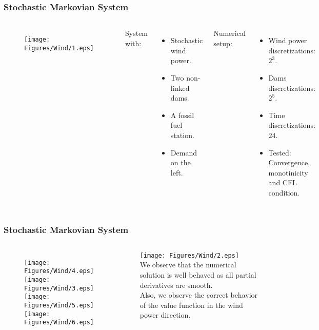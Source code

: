 
\begin{frame}
\frametitle{Stochastic Markovian System}

\begin{columns}[c]

\begin{figure}[ht!]
\centering
\texttt{[image: Figures/Wind/1.eps]}
\end{figure}

System with:
\begin{itemize}
\item Stochastic wind power.
\item Two non-linked dams.
\item A fossil fuel station.
\item Demand on the left.
\end{itemize}
Numerical setup:
\begin{itemize}
\item Wind power discretizations: $2^3$.
\item Dams discretizations: $2^5$.
\item Time discretizations: $24$.
\item Tested: Convergence, monotinicity and CFL condition.
\end{itemize}

\end{columns}
\end{frame}


\begin{frame}
\frametitle{Stochastic Markovian System}
\begin{columns}[c] %

\begin{figure}[ht!]
\centering
\texttt{[image: Figures/Wind/4.eps]}\quad
\texttt{[image: Figures/Wind/3.eps]}\\
\texttt{[image: Figures/Wind/5.eps]}\quad
\texttt{[image: Figures/Wind/6.eps]}
\end{figure}

\texttt{[image: Figures/Wind/2.eps]}\\
We observe that the numerical solution is well behaved as all partial derivatives are smooth.\\
Also, we observe the correct behavior of the value function in the wind power direction.

\end{columns}
\end{frame}

